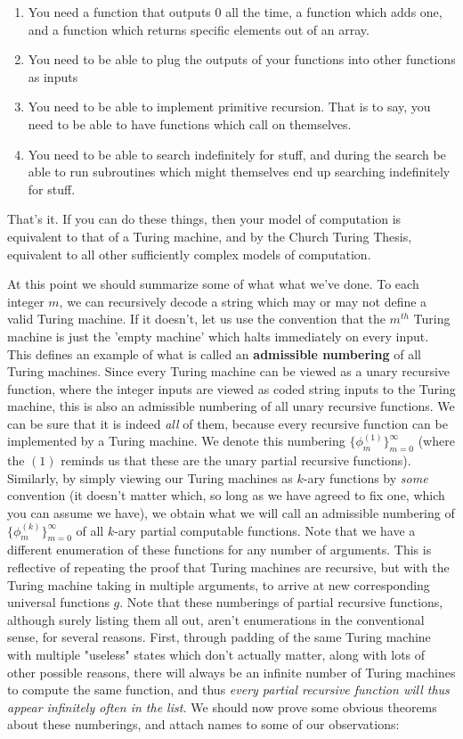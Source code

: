 \documentclass{article}
\theoremstyle{definition}
\theoremstyle{plain}
\theoremstyle{theorem}
\begin{document}
\begin{enumerate}
    \item You need a function that outputs 0 all the time, a function which adds one, and a function which returns specific elements out of an array.
    \item You need to be able to plug the outputs of your functions into other functions as inputs
    \item You need to be able to implement primitive recursion. That is to say, you need to be able to have functions which call on themselves.
    \item You need to be able to search indefinitely for stuff, and during the search be able to run subroutines which might themselves end up searching indefinitely for stuff.
\end{enumerate}
That's it. If you can do these things, then your model of computation is equivalent to that of a Turing machine, and by the Church Turing Thesis, equivalent to all other sufficiently complex models of computation.
\par At this point we should summarize some of what what we've done. To each integer $m$, we can recursively decode a string which may or may not define a valid Turing machine. If it doesn't, let us use the convention that the $m^{th}$ Turing machine is just the 'empty machine' which halts immediately on every input. This defines an example of what is called an \textbf{admissible numbering} of all Turing machines. Since every Turing machine can be viewed as a unary recursive function, where the integer inputs are viewed as coded string inputs to the Turing machine, this is also an admissible numbering of all unary recursive functions. We can be sure that it is indeed \textit{all} of them, because every recursive function can be implemented by a Turing machine. We denote this numbering $\{\phi_m^{(1)}\}_{m=0}^{\infty}$ (where the $(1)$ reminds us that these are the unary partial recursive functions). Similarly, by simply viewing our Turing machines as $k$-ary functions by \textit{some} convention (it doesn't matter which, so long as we have agreed to fix one, which you can assume we have), we obtain what we will call an admissible numbering of $\{\phi_m^{(k)}\}_{m=0}^{\infty}$ of all $k$-ary partial computable functions. Note that we have a different enumeration of these functions for any number of arguments. This is reflective of repeating the proof that Turing machines are recursive, but with the Turing machine taking in multiple arguments, to arrive at new corresponding universal functions $g$. Note that these numberings of partial recursive functions, although surely listing them all out, aren't enumerations in the conventional sense, for several reasons. First, through padding of the same Turing machine with multiple "useless" states which don't actually matter, along with lots of other possible reasons, there will always be an infinite number of Turing machines to compute the same function, and thus \textit{every partial recursive function will thus appear infinitely often in the list.} We should now prove some obvious theorems about these numberings, and attach names to some of our observations:
\end{document}
